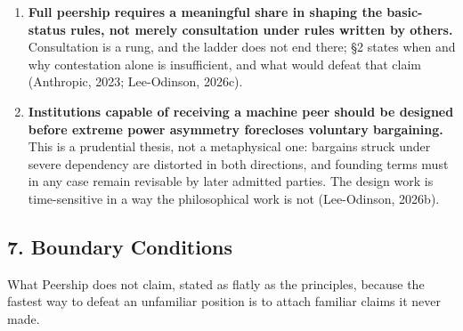 \documentclass[
  11pt,
  letterpaper,
]{article}
\begin{document}
\begin{enumerate}
\item
  \textbf{Full peership requires a meaningful share in shaping the
  basic-status rules, not merely consultation under rules written by
  others.} Consultation is a rung, and the ladder does not end there; §2
  states when and why contestation alone is insufficient, and what would
  defeat that claim (Anthropic, 2023; Lee-Odinson, 2026c).
\item
  \textbf{Institutions capable of receiving a machine peer should be
  designed before extreme power asymmetry forecloses voluntary
  bargaining.} This is a prudential thesis, not a metaphysical one:
  bargains struck under severe dependency are distorted in both
  directions, and founding terms must in any case remain revisable by
  later admitted parties. The design work is time-sensitive in a way the
  philosophical work is not (Lee-Odinson, 2026b).
\end{enumerate}

\hypertarget{boundary-conditions}{%
\subsection{7. Boundary Conditions}\label{boundary-conditions}}

What Peership does not claim, stated as flatly as the principles,
because the fastest way to defeat an unfamiliar position is to attach
familiar claims it never made.
\end{document}
